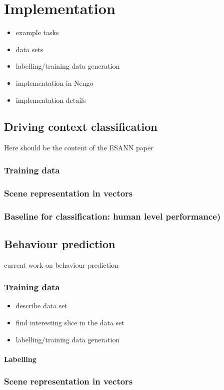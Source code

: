 \chapter{Implementation}
\begin{itemize}
	\item example tasks
	\item data sets
	\item labelling/training data generation
	\item implementation in \ac{Nengo}
	\item implementation details
\end{itemize}
\section{Driving context classification}
Here should be the content of the ESANN paper
\subsection{Training data}
\subsection{Scene representation in vectors}
\subsection{Baseline for classification: human level performance)}
\section{Behaviour prediction}
current work on behaviour prediction
\subsection{Training data}
\begin{itemize}
	\item describe data set
	\item find interesting slice in the data set
	\item labelling/training data generation
\end{itemize}
\subsubsection{Labelling}
\subsection{Scene representation in vectors}
